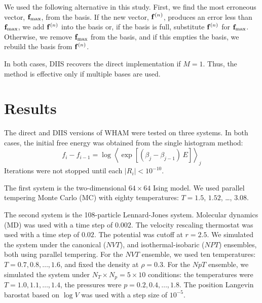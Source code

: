 \documentclass[reprint,superscriptaddress]{revtex4-1}
\begin{document}
We used the following alternative
in this study.
%
First, we find the most erroneous vector,
$\mathbf{f}_\mathrm{max}$, from the basis.
%
If the new vector, $\mathbf{f}^{(n)}$,
produces an error less than $\mathbf{f}_\mathrm{max}$,
we add $\mathbf{f}^{(n)}$ into the basis
or, if the basis is full,
substitute $\mathbf{f}^{(n)}$ for $\mathbf{f}_\mathrm{max}$.
%
Otherwise,
we remove $\mathbf{f}_\mathrm{max}$ from the basis,
and if this empties the basis,
we rebuild the basis from $\mathbf{f}^{(n)}$.
%



In both cases,
DIIS recovers the direct implementation
if $M = 1$.
%
Thus,
the method is effective
only if multiple bases are used.





\section{Results}





The direct and DIIS versions of WHAM
were tested on three systems.
%
In both cases,
the initial free energy was obtained from
the single histogram method:
%
\begin{equation*}
f_i - f_{i-1}
=
\log
\left\langle
  \exp\left[
    (\beta_j - \beta_{j-1}) \, E
  \right]
\right\rangle_j
\end{equation*}
%
Iterations were not stopped
until each $|R_i| < 10^{-10}$.



The first system is
the two-dimensional $64\times64$ Ising model.
%
We used parallel tempering\cite{
  swendsen1986, *geyer1991, *hukushima1996, *hansmann1997,
  *earl2005}
Monte Carlo (MC)
with
eighty temperatures: $T = 1.5$, $1.52$, \dots, $3.08$.



The second system is the 108-particle Lennard-Jones system.
%
Molecular dynamics (MD)
was used with a time step of $0.002$.
The velocity rescaling thermostat\cite{bussi2007}
was used with a time step of $0.02$.
%
The potential was cutoff at $r = 2.5$.
%
We simulated the system under
the canonical ($NVT$), and isothermal-isobaric ($NPT$) ensembles,
both using parallel tempering.
%
For the $NVT$ ensemble,
we used ten temperatures: $T = 0.7, 0.8, \dots, 1.6$,
and fixed the density at $\rho = 0.3$.
%
For the $NpT$ ensemble,
we simulated the system
under $N_T \times N_p = 5\times 10$ conditions:
the temperatures were $T = 1.0, 1.1, \dots, 1.4$,
the pressures were $p = 0.2, 0.4, \dots, 1.8$.
%
The position Langevin barostat based on $\log V$
was used with a step size of $10^{-5}$.
\end{document}
